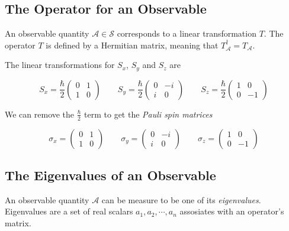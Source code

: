 \documentclass[a4paper]{article}
\begin{document}
\subsection{The Operator for an Observable}

An observable quantity \(\mathcal{A} \in \mathscr{S}\) corresponds to a linear
transformation \(T\). The operator \(T\) is defined by a Hermitian matrix, meaning that
\(T_\mathcal{A}^{\dagger}=T_\mathcal{A}\).

The linear transformations for \(S_x\), \(S_y\) and \(S_z\) are

\[
    S_x = \frac{\hbar}{2}
    \begin{pmatrix}
        0 & 1 \\
        1 & 0
    \end{pmatrix}
    \quad\quad
    S_y = \frac{\hbar}{2}
    \begin{pmatrix}
        0 & -i \\
        i & 0
    \end{pmatrix}
    \quad\quad
    S_z = \frac{\hbar}{2}
    \begin{pmatrix}
        1 & 0 \\
        0 & -1
    \end{pmatrix}
\]

We can remove the \(\frac{\hbar}{2}\) term to get the \textit{Pauli spin matrices}

\[
    \sigma_x =
    \begin{pmatrix}
        0 & 1 \\
        1 & 0
    \end{pmatrix}
    \quad\quad
    \sigma_y =
    \begin{pmatrix}
        0 & -i \\
        i & 0
    \end{pmatrix}
    \quad\quad
    \sigma_z =
    \begin{pmatrix}
        1 & 0 \\
        0 & -1
    \end{pmatrix}
\]

\pagebreak

\subsection{The Eigenvalues of an Observable}

An observable quantity \(\mathcal{A}\) can be measure to be one of its \textit{eigenvalues}.
Eigenvalues are a set of real scalars \(a_1, a_2, \cdots , a_n\) assosiates with
an operator's matrix.
\end{document}
